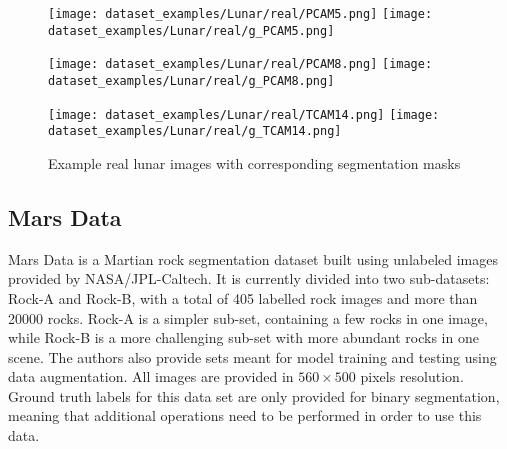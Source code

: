 \documentclass[a4paper,twoside,12pt]{book}
\begin{document}
\begin{figure}[ht!]
    \centering
    \texttt{[image: dataset\_examples/Lunar/real/PCAM5.png]}
    \texttt{[image: dataset\_examples/Lunar/real/g\_PCAM5.png]}

    \texttt{[image: dataset\_examples/Lunar/real/PCAM8.png]}
    \texttt{[image: dataset\_examples/Lunar/real/g\_PCAM8.png]}

    \texttt{[image: dataset\_examples/Lunar/real/TCAM14.png]}
    \texttt{[image: dataset\_examples/Lunar/real/g\_TCAM14.png]}
    \caption{Example real lunar images with corresponding segmentation masks}
    \label{fig:data_real_example1}
\end{figure}

\subsection{Mars Data}
Mars Data \cite{xiao2021kernel} is a Martian rock segmentation dataset built using unlabeled images provided by NASA/JPL-Caltech. It is currently divided into two sub-datasets: Rock-A and Rock-B, with a total of 405 labelled rock images and more than 20000 rocks. Rock-A is a simpler sub-set, containing a few rocks in one image, while Rock-B is a more challenging sub-set with more abundant rocks in one scene. The authors also provide sets meant for model training and testing using data augmentation. All images are provided in $560 \times 500$ pixels resolution. Ground truth labels for this data set are only provided for binary segmentation, meaning that additional operations need to be performed in order to use this data.
\end{document}
